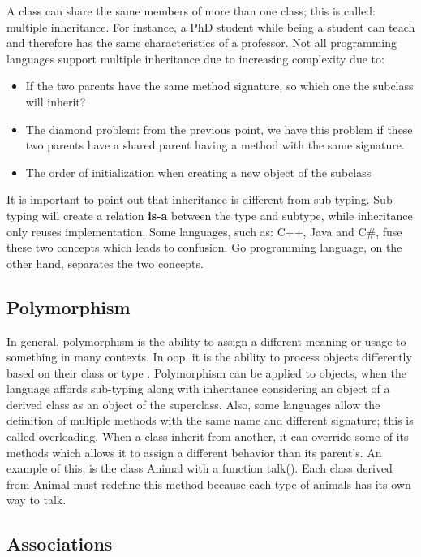 \documentclass[12pt]{book}
\begin{document}
A class can share the same members of more than one class; this is called: multiple inheritance. 
For instance, a PhD student while being a student can teach and therefore has the same characteristics of a professor. 
Not all programming languages support multiple inheritance due to increasing complexity due to:
\begin{itemize}
	\item If the two parents have the same method signature, so which one the subclass will inherit?
	\item The diamond problem: from the previous point, we have this problem if these two parents have a shared parent having a method with the same signature.
	\item The order of initialization when creating a new object of the subclass 
\end{itemize}

It is important to point out that inheritance is different from sub-typing\citep{1989-cook-al}. 
Sub-typing will create a relation \textbf{is-a} between the type and subtype, while inheritance only reuses implementation.
Some languages, such as: C++, Java and C\#, fuse these two concepts which leads to confusion.
Go programming language, on the other hand, separates the two concepts.  

\subsection{Polymorphism}

In general, polymorphism is the ability to assign a different meaning or usage to something in many contexts. 
In \ac{oop}, it is the ability to process objects differently based on their class or type \citep{2016-techdifferences}. 
Polymorphism can be applied to objects, when the language affords sub-typing along with inheritance considering an object of a derived class as an object of the superclass. 
Also, some languages allow the definition of multiple methods with the same name and different signature; this is called overloading.
When a class inherit from another, it can override some of its methods which allows it to assign a different behavior than its parent's.
An example of this, is the class Animal with a function talk(). 
Each class derived from Animal must redefine this method because each type of animals has its own way to talk.


\subsection{Associations}
\end{document}
